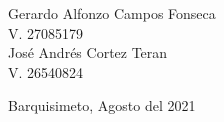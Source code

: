 \begin{titlepage}
\begin{table}[t]
\begin{flushright}
Gerardo Alfonzo Campos Fonseca\\
V. 27085179\\
José Andrés Cortez Teran\\
V. 26540824\\

\vspace*{2mm}


\end{flushright}
\vspace*{5mm}

\begin{center}Barquisimeto, Agosto del 2021\end{center}
\end{table}
\end{titlepage}

